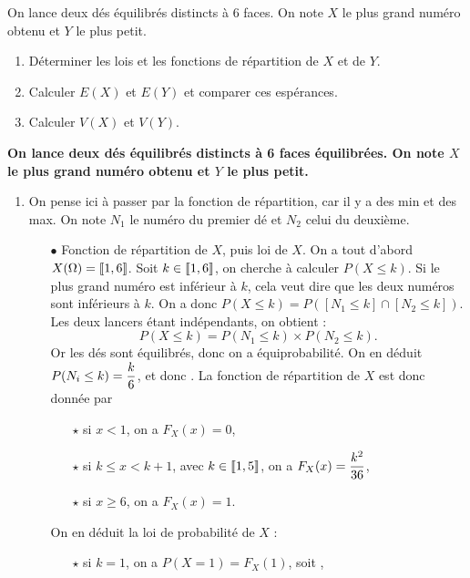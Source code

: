 \documentclass[a4paper, 11pt,reqno]{article}
\begin{document}
\begin{exercice}  \;
	On lance deux d\'es \'equilibr\'es distincts \`a 6 faces. On note $X$ le plus grand num\'ero obtenu et $Y$ le plus petit.
	\begin{enumerate}
		\item D\'eterminer les lois et les fonctions de r\'epartition de $X$ et de $Y$.
		\item Calculer $E(X)$ et $E(Y)$ et comparer ces esp\'erances.
		\item Calculer $V(X)$ et $V(Y)$.
	\end{enumerate}
\end{exercice}
\begin{correction}  \;
	\textbf{On lance deux d\'es \'equilibr\'es distincts \`a 6 faces \'equilibr\'ees. On note $X$ le plus grand num\'ero obtenu et $Y$ le plus petit.}
	\begin{enumerate}
		\item On pense ici \`a passer par la fonction de r\'epartition, car il y a des min et des max. On note $N_1$ le num\'ero du premier d\'e et $N_2$ celui du deuxi\`eme.
		      \begin{itemize}
			      \item[$\bullet$] Fonction de r\'epartition de $X$, puis loi de $X$. On a tout d'abord $X(\Omega) = \llbracket  1, 6\rrbracket$. Soit $k \in  \llbracket  1, 6\rrbracket$, on cherche \`a calculer $P(X\leq k)$. Si le plus grand num\'ero est inf\'erieur \`a $k$, cela veut dire que les deux num\'eros sont inf\'erieurs \`a $k$. On a donc $P(X\leq k) = P([N_1\leq k]\cap[N_2\leq k])$. Les deux lancers \'etant ind\'ependants, on obtient :
				      $$P(X\leq k) = P(N_1\leq k) \times P(N_2\leq k).$$
				      Or les d\'es sont \'equilibr\'es, donc on a \'equiprobabilit\'e. On en d\'eduit $\displaystyle P(N_i \leq k) = \frac{k}{6}$, et donc .
				      La fonction de r\'epartition de $X$ est donc donn\'ee par
				      \begin{itemize}
					      \item[$\star$] si $x<1$, on a $F_X(x) = 0$,
					      \item[$\star$] si $k\leq x < k+1$, avec $k\in \llbracket  1,5\rrbracket$, on a $F_X(x) = \displaystyle \frac{k^2}{36}$,
					      \item[$\star$] si $x\geq 6$, on a $F_X(x) = 1$.
				      \end{itemize}
				      On en d\'eduit la loi de probabilit\'e de $X$ :
				      \begin{itemize}
					      \item[$\star$] si $k=1$, on a $P(X=1) = F_X(1)$, soit ,

\end{itemize}
\end{itemize}
\end{enumerate}
\end{correction}
\end{document}
